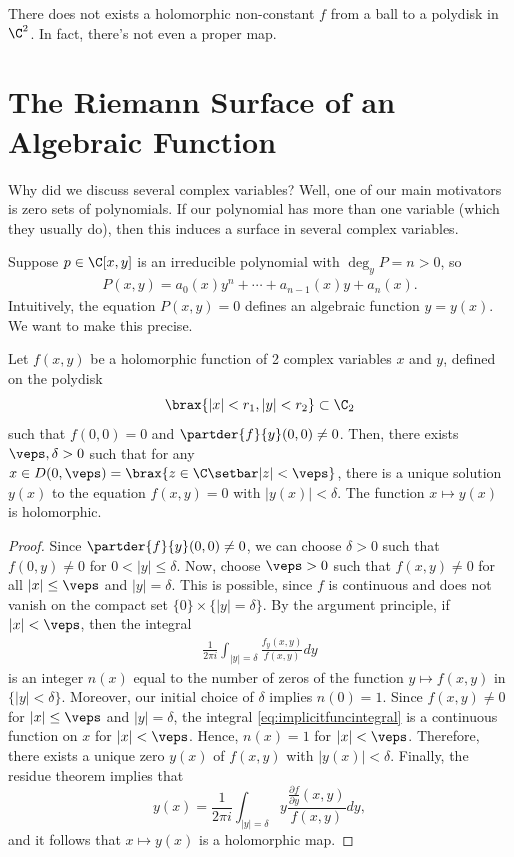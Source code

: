 \documentclass[11pt]{report}
\begin{document}
\begin{thm}
    There does not exists a holomorphic non-constant $f$ from a ball to a polydisk in $\C^2$. In fact, there's not even a proper map.
\end{thm}

\section{The Riemann Surface of an Algebraic Function}

Why did we discuss several complex variables? Well, one of our main motivators is zero sets of polynomials. If our polynomial has more than one variable (which they usually do), then this induces a surface in several complex variables.

Suppose $p\in \C[x,y]$ is an irreducible polynomial with $\deg_yP =n>0$, so 
\begin{align} \label{eq:P(x,y)}
    P(x,y)=a_0(x)y^n+\cdots + a_{n-1}(x)y+a_n(x).
\end{align}
Intuitively, the equation $P(x,y)=0$ defines an algebraic function $y=y(x)$. We want to make this precise.

\begin{thm}
    Let $f(x,y)$ be a holomorphic function of 2 complex variables $x$ and $y$, defined on the polydisk $$\brax{|x|<r_1,|y|<r_2}\subset \C_2$$ such that $f(0,0)=0$ and $\partder{f}{y}(0,0)\neq 0$. Then, there exists $\veps,\delta>0$ such that for any $x \in D(0,\veps)=\brax{z \in \C \setbar |z|<\veps}$, there is a unique solution $y(x)$ to the equation $f(x,y)=0$ with $|y(x)|<\delta$.  The function $x \mapsto y(x)$ is holomorphic.
\end{thm}

\begin{proof}
    Since $\partder{f}{y}(0,0)\neq 0$, we can choose $\delta>0$ such that $f(0,y)\neq 0$ for $0<|y| \le \delta$. Now, choose $\veps>0$ such that $f(x,y)\neq 0$ for all $|x| \leq \veps$ and $|y|=\delta$. This is possible, since $f$ is continuous and does not vanish on the compact set $\{0\} \times \{|y|=\delta\}$. By the argument principle, if $|x|<\veps$, then the integral
    \begin{align} \label{eq:implicitfuncintegral}
        \frac{1}{2\pi i}\int_{|y|=\delta}\frac{f_y(x,y)}{f(x,y)}dy
    \end{align}
    is an integer $n(x)$ equal to the number of zeros of the function $y \mapsto f(x,y)$ in $\{|y|<\delta\}$. Moreover, our initial choice of $\delta$ implies $n(0)=1$. Since $f(x,y) \neq 0$ for $|x| \leq \veps$ and $|y|=\delta$, the integral \eqref{eq:implicitfuncintegral} is a continuous function on $x$ for $|x|<\veps$. Hence, $n(x)=1$ for $|x|<\veps$. Therefore, there exists a unique zero $y(x)$ of $f(x,y)$ with $|y(x)|<\delta$. Finally, the residue theorem implies that 
    $$y(x) = \frac{1}{2\pi i}\int_{|y|=\delta}y\frac{ \frac{\partial f}{\partial y}(x,y) }{f(x,y)}dy,$$
    and it follows that $x \mapsto y(x)$ is a holomorphic map.
\end{proof}
\end{document}
